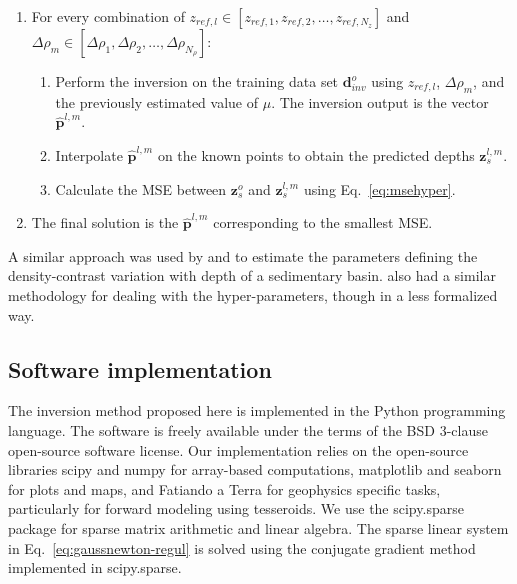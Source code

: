 \documentclass[extra,mreferee]{gji}
\begin{document}
\begin{enumerate}
    \item For every combination of
        $z_{ref,l} \in [z_{ref,1},z_{ref,2},\ldots,z_{ref,N_z}]$ and
        $\Delta\rho_m \in
         [\Delta\rho_1,\Delta\rho_2,\ldots,\Delta\rho_{N_{\rho}}]$:
    \begin{enumerate}
        \item Perform the inversion on the training data set
            $\mathbf{d}^o_{inv}$ using $z_{ref,l}$, $\Delta\rho_m$, and
            the previously estimated value of $\mu$.
            The inversion output is the vector $\mathbf{\hat{p}}^{l,m}$.
        \item Interpolate $\mathbf{\hat{p}}^{l,m}$
            on the known points to obtain the predicted depths
            $\mathbf{z}_s^{l,m}$.
        \item Calculate the MSE between $\mathbf{z}_s^o$ and
            $\mathbf{z}_s^{l,m}$ using Eq.~\ref{eq:msehyper}.
    \end{enumerate}
    \item The final solution is the $\mathbf{\hat{p}}^{l,m}$ corresponding to
        the smallest MSE.
\end{enumerate}

A similar approach was used by \citet{silva2006} and \citet{martins2010}
to estimate the parameters defining
the density-contrast variation with depth
of a sedimentary basin.
\citet{vandermeijde2013} also had
a similar methodology for dealing with the hyper-parameters,
though in a less formalized way.



\subsection{Software implementation}\label{sec:software}

The inversion method proposed here is implemented in the Python programming
language.
The software is freely available
under the terms of the BSD 3-clause open-source software license.
Our implementation relies on the open-source libraries
scipy and numpy \citep[][ \url{http://scipy.org}]{jones2001}
for array-based computations,
matplotlib \citep[][ \url{http://matplotlib.org}]{hunter2007}
and seaborn
\citep[][ \url{http://stanford.edu/~mwaskom/software/seaborn}]{waskom2015}
for plots and maps,
and Fatiando a Terra \citep[][ \url{http://www.fatiando.org}]{uieda2013a}
for geophysics specific tasks,
particularly for forward modeling using tesseroids.
We use the scipy.sparse package for sparse matrix arithmetic and linear
algebra.
The sparse linear system in Eq.~\ref{eq:gaussnewton-regul}
is solved using the conjugate gradient method implemented in scipy.sparse.
\end{document}
